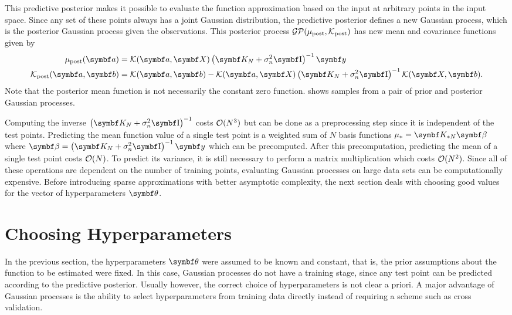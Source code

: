 This predictive posterior makes it possible to evaluate the function approximation based on the input at arbitrary points in the input space.
Since any set of these points always has a joint Gaussian distribution, the predictive posterior defines a new Gaussian process, which is the posterior Gaussian process given the observations.
This posterior process $\operatorname{\mathcal{GP}}(\mu_\text{post}, \operatorname{\mathcal{K}}_\text{post})$ has new mean and covariance functions given by
\begin{align}
    \begin{split}
        \mu_\text{post}(\mat{a}) &= \K(\mat{a}, \mat{X}) \left(\mat{K_N} + \sigma_n^2 \Eye \right)^{-1} \mat{y} \\
        \K_\text{post}(\mat{a}, \mat{b}) &= \K(\mat{a}, \mat{b}) - \K(\mat{a}, \mat{X}) \left( \mat{K_N} + \sigma_n^2 \Eye \right)^{-1} \K(\mat{X}, \mat{b}).
    \end{split}
\end{align}
Note that the posterior mean function is not necessarily the constant zero function.
 shows samples from a pair of prior and posterior Gaussian processes.

Computing the inverse $\left(\mat{K_N} + \sigma_n^2 \Eye \right)^{-1}$ costs $\operatorname{\mathcal{O}}(N^3)$ but can be done as a preprocessing step since it is independent of the test points.
Predicting the mean function value of a single test point is a weighted sum of $N$ basis functions $\mu_\ast = \mat{K_{\ast N}} \mat{\beta}$ where $\mat{\beta} = \left(\mat{K_N} + \sigma_n^2 \Eye \right)^{-1} \mat{y}$ which can be precomputed.
After this precomputation, predicting the mean of a single test point costs $\operatorname{\mathcal{O}}(N)$.
To predict its variance, it is still necessary to perform a matrix multiplication which costs $\operatorname{\mathcal{O}}(N^2)$.
Since all of these operations are dependent on the number of training points, evaluating Gaussian processes on large data sets can be computationally expensive.
Before introducing sparse approximations with better asymptotic complexity, the next section deals with choosing good values for the vector of hyperparameters $\mat{\theta}$.

\section{Choosing Hyperparameters}
In the previous section, the hyperparameters $\mat{\theta}$ were assumed to be known and constant, that is, the prior assumptions about the function to be estimated were fixed.
In this case, Gaussian processes do not have a training stage, since any test point can be predicted according to the predictive posterior.
Usually however, the correct choice of hyperparameters is not clear a priori.
A major advantage of Gaussian processes is the ability to select hyperparameters from training data directly instead of requiring a scheme such as cross validation.

